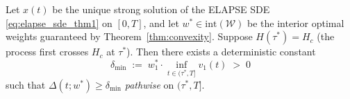%
%

\begin{lemma}
\label{lem:delta_min}
Let $x(t)$ be the unique strong solution of the ELAPSE SDE
\eqref{eq:elapse_sde_thm1} on $[0,T]$, and let $w^*\in\mathrm{int}(\mathcal{W})$
be the interior optimal weights guaranteed by Theorem~\ref{thm:convexity}.
Suppose $H(\tau^*)=H_c$ (the process first crosses $H_c$ at $\tau^*$).
Then there exists a deterministic constant
\begin{equation}
  \delta_{\min} \;:=\; w^*_1 \cdot \inf_{t\in(\tau^*,T]} v_1(t) \;>\; 0
  \label{eq:delta_min_def}
\end{equation}
such that $\Delta(t;w^*)\ge\delta_{\min}$ \emph{pathwise} on $(\tau^*,T]$.
\end{lemma}

